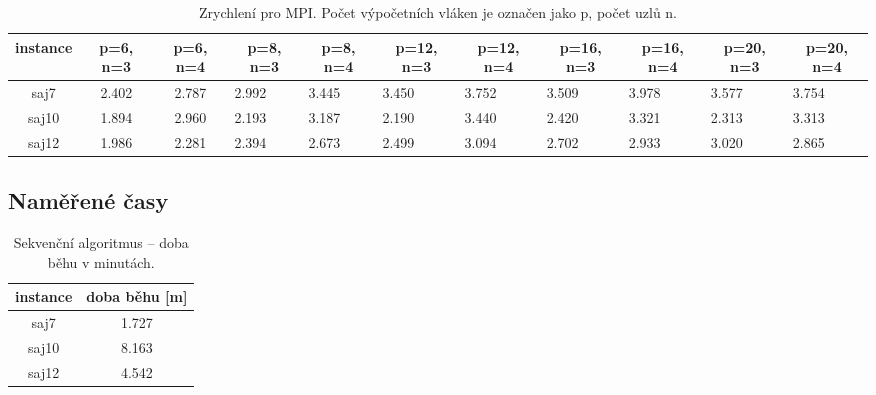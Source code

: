 \documentclass{article}
\begin{document}
    \begin{table}[h]
        \centering
        \begin{tabular}{|c|c|c|l|l|l|l|l|l|l|l|}
            \hline
            \textbf{instance} &
            \textbf{p=6, n=3} &
            \textbf{p=6, n=4} &
            \multicolumn{1}{c|}{\textbf{p=8, n=3}} &
            \multicolumn{1}{c|}{\textbf{p=8, n=4}} &
            \multicolumn{1}{c|}{\textbf{p=12, n=3}} &
            \multicolumn{1}{c|}{\textbf{p=12, n=4}} &
            \multicolumn{1}{c|}{\textbf{p=16, n=3}} &
            \multicolumn{1}{c|}{\textbf{p=16, n=4}} &
            \multicolumn{1}{c|}{\textbf{p=20, n=3}} &
            \multicolumn{1}{c|}{\textbf{p=20, n=4}} \\ \hline
            saj7  & 2.402 & 2.787 & 2.992 & 3.445 & 3.450 & 3.752 & 3.509 & 3.978 & 3.577 & 3.754 \\ \hline
            saj10 & 1.894 & 2.960 & 2.193 & 3.187 & 2.190 & 3.440 & 2.420 & 3.321 & 2.313 & 3.313 \\ \hline
            saj12 & 1.986 & 2.281 & 2.394 & 2.673 & 2.499 & 3.094 & 2.702 & 2.933 & 3.020 & 2.865 \\ \hline
        \end{tabular}
        \caption{ Zrychlení pro MPI. Počet výpočetních vláken je označen jako p, počet uzlů n.}
        \label{tab:speedup-mpi}
    \end{table}

    \subsection{Naměřené časy}
    \begin{table}[hb!]
        \centering
        \begin{tabular}{|c|c|}
            \hline
            \multicolumn{1}{|l|}{\textbf{instance}} & \multicolumn{1}{l|}{\textbf{{}doba běhu} {[}m{]}} \\ \hline
            saj7                           & 1.727                                       \\ \hline
            saj10                          & 8.163                                       \\ \hline
            saj12                          & 4.542                                       \\ \hline
        \end{tabular}
        \caption{Sekvenční algoritmus -- doba běhu v minutách.}
        \label{tab:seq}
    \end{table}
\end{document}
